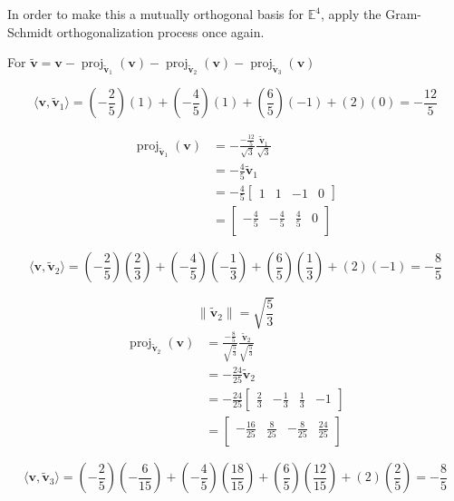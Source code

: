 \documentclass{tufte-book}
\DeclareMathOperator{\proj}{proj}
\newcommand{\vct}{\mathbf}
\newcommand{\dprod}[2]{\langle #1, #2 \rangle}
\theoremstyle{mytheoremstyle}
\theoremstyle{mylemstyle}
\theoremstyle{mydefstyle}
\begin{document}
\begin{enumerate}
In order to make this a mutually orthogonal basis for $\mathbb{E}^4$, apply the Gram-Schmidt orthogonalization process once again.

For $\vct{\tilde{v}} = \vct{v} - \proj_{\vct{\tilde{v}}_1}(\vct{v}) - \proj_{\vct{\tilde{v}}_2}(\vct{v})- \proj_{\vct{\tilde{v}}_3}(\vct{v})$

\[
\dprod{\vct{v}}{\vct{\tilde{v}}_1} =  (-\frac{2}{5})(1) + (-\frac{4}{5})(1) + (\frac{6}{5})(-1) + (2)(0) = -\frac{12}{5}
\]

\begin{align*}
\proj_{\vct{\tilde{v}}_1}(\vct{v})  &= -\frac{-\frac{12}{5}}{\sqrt{3}}\frac{\vct{\tilde{v}}_1}{\sqrt{3}}\\
&= -\frac{4}{5}\vct{\tilde{v}}_1\\
&= -\frac{4}{5}
\begin{bmatrix}
1 & 1 & -1 & 0
\end{bmatrix}\\
&= \begin{bmatrix}
-\frac{4}{5} & -\frac{4}{5} & \frac{4}{5} &  0 \\
\end{bmatrix}
\end{align*}

\[
\dprod{\vct{v}}{\vct{\tilde{v}}_2} =  (-\frac{2}{5})(\frac{2}{3}) + (-\frac{4}{5})(-\frac{1}{3}) + (\frac{6}{5})(\frac{1}{3}) + (2)(-1) = -\frac{8}{5}
\]

\[ \|\vct{\tilde{v}}_2\| = \sqrt{\frac{5}{3}} \]
\begin{align*}
\proj_{\vct{\tilde{v}}_2}(\vct{v})  &= \frac{-\frac{8}{5}}{\sqrt{\frac{5}{3}}}\frac{\vct{\tilde{v}}_2}{\sqrt{\frac{5}{3}}}\\
&= -\frac{24}{25}\vct{\tilde{v}}_2\\
&= -\frac{24}{25}
\begin{bmatrix}
\frac{2}{3} & -\frac{1}{3} & \frac{1}{3} & -1
\end{bmatrix}\\
&= \begin{bmatrix}
-\frac{16}{25} & \frac{8}{25} & -\frac{8}{25} & \frac{24}{25} \\
\end{bmatrix}
\end{align*}


\[
\dprod{\vct{v}}{\vct{\tilde{v}}_3} =  (-\frac{2}{5})(-\frac{6}{15}) + (-\frac{4}{5})(\frac{18}{15}) + (\frac{6}{5})(\frac{12}{15}) + (2)(\frac{2}{5}) = -\frac{8}{5}
\]


\end{enumerate}
\end{document}
